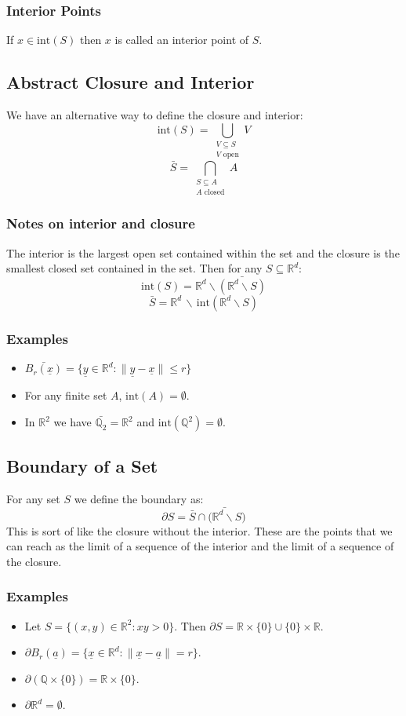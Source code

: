 \documentclass[12pt]{article}
\begin{document}
\subsubsection{Interior Points}
If \(x\in\text{int}(S)\) then \(x\) is called an interior point of \(S\).
\subsection{Abstract Closure and Interior}
We have an alternative way to define the closure and interior:
\[\text{int}(S)=\bigcup_{\substack{V\subseteq S\\V \text{ open}}}V\]
\[\bar{S}=\bigcap_{\substack{S\subseteq A\\A\text{ closed}}}A\]
\subsubsection{Notes on interior and closure}
The interior is the largest open set contained within the set and the closure is the smallest closed set contained in the set. Then for any \(S\subseteq\mathbb{R}^d\):
\[\text{int}(S)=\mathbb{R}^d\backslash\bar{(\mathbb{R}^d\backslash S)}\]
\[\bar{S}=\mathbb{R}^d\,\backslash\,\text{int}(\mathbb{R}^d\backslash S)\]
\subsubsection{Examples}
\begin{itemize}
    \item \(\bar{B_r(\underline{x})}=\{\underline{y}\in\mathbb{R}^d: \|\underline{y}-\underline{x}\|\leq r\}\)
    \item For any finite set \(A\), \(\text{int}(A)=\emptyset\).
    \item In \(\mathbb{R}^2\) we have \(\bar{\mathbb{Q}_2}=\mathbb{R}^2\) and \(\text{int}(\mathbb{Q}^2)=\emptyset\).
\end{itemize}
\subsection{Boundary of a Set}
For any set \(S\) we define the boundary as:
\[\partial S=\bar{S}\cap\bar{(\mathbb{R}^d\backslash S})\]
This is sort of like the closure without the interior. These are the points that we can reach as the limit of a sequence of the interior and the limit of a sequence of the closure.
\subsubsection{Examples}
\begin{itemize}
    \item Let \(S=\{(x,y)\in\mathbb{R}^2:xy>0\}\). Then \(\partial S=\mathbb{R}\times\{0\}\cup \{0\}\times \mathbb{R}\).
    \item \(\partial B_r(\underline{a})=\{\underline{x}\in\mathbb{R}^d:\|\underline{x}-\underline{a}\|=r\}\).
    \item \(\partial(\mathbb{Q}\times\{0\})=\mathbb{R}\times\{0\}\).
    \item \(\partial\mathbb{R}^d=\emptyset\).
\end{itemize}
\end{document}
